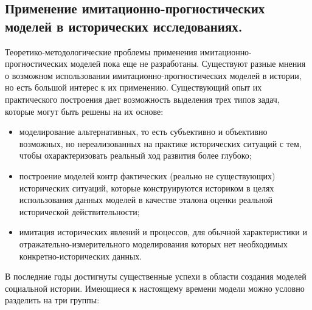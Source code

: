 \subsection{Применение имитационно-прогностических моделей в исторических исследованиях.}

Теоретико-методологические проблемы применения имитационно-прогностических моделей пока еще не разработаны.
Существуют разные мнения о возможном использовании имитационно-прогностических моделей в истории, но есть большой интерес к их применению. 
Существующий опыт их практического построения дает возможность выделения трех типов задач, которые могут быть решены на их основе:

\begin{itemize}
\tightlist
\item
  моделирование альтернативных, то есть субъективно и объективно возможных, но нереализованных на практике исторических ситуаций с тем, чтобы охарактеризовать реальный ход развития более глубоко; 
\item
  построение моделей контр фактических (реально не существующих) исторических ситуаций, которые конструируются историком в целях использования данных моделей в качестве эталона оценки реальной исторической действительности; 
\item
  имитация исторических явлений и процессов, для обычной характеристики и отражательно-измерительного моделирования которых нет необходимых конкретно-исторических данных.
\end{itemize}

В последние годы достигнуты существенные успехи в области создания моделей социальной истории. 
Имеющиеся к настоящему времени модели можно условно разделить на три группы:

